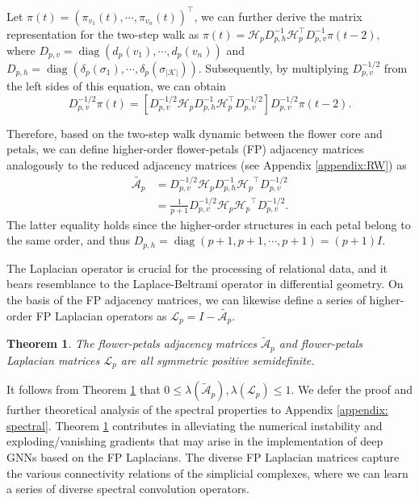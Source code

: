 \documentclass[letterpaper]{article} \usepackage{aaai24}
\theoremstyle{plain}
\newtheorem{theorem}{Theorem}[section]
\theoremstyle{definition}
\theoremstyle{remark}
\begin{document}
Let $\pi(t) = \left(\pi_{v_1}(t),\cdots,\pi_{v_n}(t)\right)^\top$, we can further derive the matrix representation for the two-step walk as $\pi(t) = \mathcal{H}_p D_{p,h}^{-1} \mathcal{H}_p^\top D_{p,v}^{-1} \pi(t-2),$
where $D_{p,v}=\operatorname{diag}\left(d_p(v_1),\cdots,d_p(v_n)\right)$ and $D_{p,h}=\operatorname{diag}\left(\delta_p(\sigma_1),\cdots,\delta_p(\sigma_{|\mathcal{K}|})\right)$.
Subsequently, by multiplying $D_{p,v}^{-1/2}$ from the left sides of this equation, we can obtain
\begin{equation}
    D_{p,v}^{-1/2}\pi(t) =\left[D_{p,v}^{-1/2} \mathcal{H}_p  D_{p,h}^{-1}   \mathcal{H}_p ^\top  D_{p,v}^{-1/2}\right]D_{p,v}^{-1/2} \pi(t-2).
\end{equation}
    

Therefore, based on the two-step walk dynamic between the flower core and petals, we can define higher-order flower-petals (FP) adjacency matrices analogously to the reduced adjacency matrices (see Appendix \ref{appendix:RW}) as
\begin{equation}
    \begin{split}
        \tilde{\mathcal{A}_p} 
     &= D_{p,v}^{-1/2}\mathcal{H}_p D_{p,h}^{-1} {\mathcal{H}_p}^\top D_{p,v}^{-1/2}\\
     &= \frac{1}{p+1}D_{p,v}^{-1/2}\mathcal{H}_p{\mathcal{H}_p}^\top D_{p,v}^{-1/2}. 
    \end{split}
\end{equation}
The latter equality holds since the higher-order structures in each petal belong to the same order, and thus ${D_{p,h}} = \operatorname{diag} \left(p+1,p+1,\cdots,p+1\right)=(p+1)I$. 


The Laplacian operator is crucial for the processing of relational data, and it bears resemblance to the Laplace-Beltrami operator in differential geometry.
On the basis of the FP adjacency matrices, we can likewise define a series of higher-order FP Laplacian operators as
$
 \mathcal{L}_p = I - \tilde{\mathcal{A}_p}.
$
   



\begin{theorem}
\label{theorem: semi-positive}
The flower-petals adjacency matrices $\tilde{\mathcal{A}}_p$ and flower-petals Laplacian matrices $\mathcal{L}_p$ are all symmetric positive semidefinite.
\end{theorem}

It follows from Theorem \ref{theorem: semi-positive} that $0 \leq \lambda(\tilde{\mathcal{A}}_p), \lambda\left(\mathcal{L}_p\right)\leq 1$.
We defer the proof and further theoretical analysis of the spectral properties to Appendix \ref{appendix: spectral}.
Theorem \ref{theorem: semi-positive} contributes in  alleviating the numerical instability and exploding/vanishing gradients that may arise in the implementation of deep GNNs based on the FP Laplacians.
The diverse FP Laplacian matrices capture the various connectivity relations of the simplicial complexes, where we can learn a series of diverse spectral convolution operators.
\end{document}
